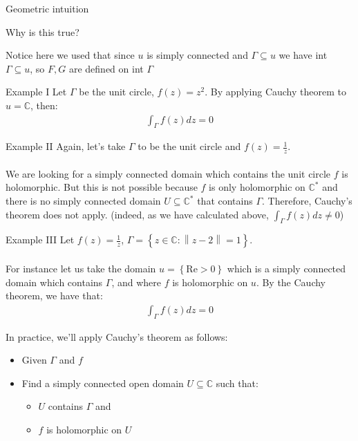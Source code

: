 \begin{parag}{Geometric intuition}
\begin{subparag}{Why is this true?}
	\end{subparag}
	Notice here we used that since $u$ is simply connected and $\Gamma \subseteq u$ we have  int $ \Gamma \subseteq u$, so $F, G$ are defined on int $ \Gamma$
\end{parag}


\begin{parag}{Example I}
	Let $\Gamma$ be the unit circle, $f\left(z\right) = z^2$. By applying Cauchy theorem to $u = \mathbb{C}$, then:
	\begin{align*} 
		\int_\Gamma f\left(z\right)dz = 0
	\end{align*}
\end{parag}
\begin{parag}{Example II}
    Again, let's take $\Gamma$ to be the unit circle and $f\left(z\right) = \frac{1}{z}$.\\
	$ $\\
	We are looking for a simply connected domain which contains the unit circle  $f$ is holomorphic. But this is not possible because $f$ is only holomorphic on $\mathbb{C}^{\ast}$ and there is no simply connected domain $U \subseteq \mathbb{C}^{\ast}$ that contains $\Gamma$. Therefore, Cauchy's theorem does not apply. (indeed, as we have calculated above, $\int_\Gamma f\left(z\right)dz \neq 0$)
\end{parag}


\begin{parag}{Example III}
    Let $f\left(z\right) = \frac{1}{z}$, $\Gamma =  \left\{z \in \mathbb{C}: \left\|z - 2\right\|= 1\right\}$.\\
	$ $\\
	For instance let us take the domain $u =  \left\{ \text{Re} > 0\right\}$ which is a simply connected domain which contains $\Gamma$, and where $f$ is holomorphic on $u$. By the Cauchy theorem, we have that:
	\begin{align*} 
		\int_\Gamma f\left(z\right)dz = 0
	\end{align*}
\end{parag}
In practice, we'll apply Cauchy's theorem as follows:
\begin{itemize}
	\item Given $\Gamma$ and $f$
	\item Find a simply connected open domain $U \subseteq \mathbb{C}$ such that:
		\begin{itemize}
			\item $U$ contains $\Gamma$ and
			\item $f$ is holomorphic on $U$
		\end{itemize}
\end{itemize}

